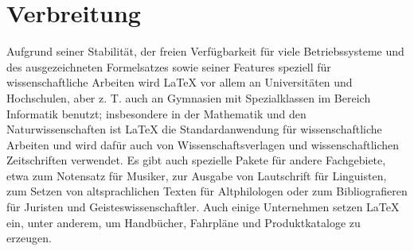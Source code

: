 
\chapter{Verbreitung}

Aufgrund seiner Stabilität, der freien Verfügbarkeit für viele Betriebssysteme und des ausgezeichneten Formelsatzes sowie seiner Features speziell für wissenschaftliche Arbeiten wird LaTeX vor allem an Universitäten und Hochschulen, aber z. T. auch an Gymnasien mit Spezialklassen im Bereich Informatik benutzt; insbesondere in der Mathematik und den Naturwissenschaften ist LaTeX die Standardanwendung für wissenschaftliche Arbeiten und wird dafür auch von Wissenschaftsverlagen und wissenschaftlichen Zeitschriften verwendet.\cite{TeX}\cite{Gaudeul} Es gibt auch spezielle Pakete für andere Fachgebiete, etwa zum Notensatz für Musiker, zur Ausgabe von Lautschrift für Linguisten, zum Setzen von altsprachlichen Texten für Altphilologen oder zum Bibliografieren für Juristen und Geisteswissenschaftler. Auch einige Unternehmen setzen LaTeX ein, unter anderem, um Handbücher, Fahrpläne und Produktkataloge zu erzeugen.